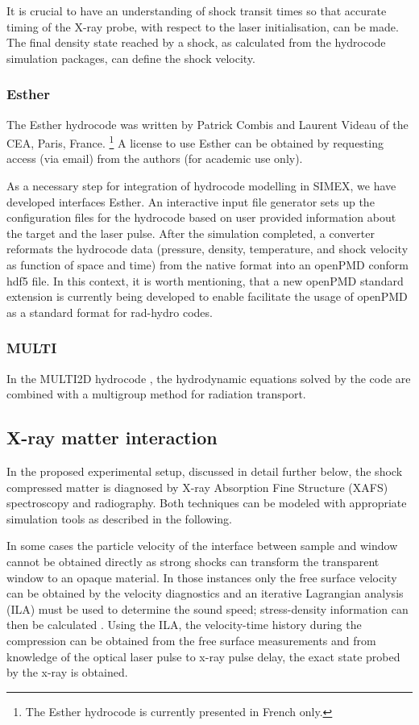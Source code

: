 \documentclass[12pt]{scrartcl}
\begin{document}
It is crucial to have an understanding of shock transit times so that accurate timing of the X-ray probe,
with respect to the laser initialisation, can be made. The final density state reached by a shock, as calculated
from the hydrocode simulation packages, can define the shock velocity.
\subsubsection{Esther}
The Esther hydrocode was written by Patrick Combis and Laurent Videau of the CEA, Paris, France.
\footnote{The Esther hydrocode is currently presented in French only.}
A license to use Esther can be obtained by requesting access (via email) from the authors (for academic use only).

As a necessary step for integration of hydrocode modelling in SIMEX, we have
developed interfaces Esther. An interactive input file generator sets up
the configuration files for the hydrocode based on user provided information
about the target and the laser pulse. After the simulation completed, a
converter reformats the hydrocode data (pressure, density, temperature, and
shock velocity as function of space and time) from the native format into an
openPMD conform hdf5 file. In this context, it is worth mentioning, that a new
openPMD standard extension is currently being developed to enable facilitate the
usage of openPMD as a standard format for rad-hydro codes.

\subsubsection{MULTI}
In the MULTI2D hydrocode \cite{Ramis2009},
the hydrodynamic equations solved by the code are combined with a multigroup method for radiation transport.

\subsection{X-ray matter interaction}
In the proposed experimental setup, discussed in detail further below, the shock compressed matter is diagnosed by
X-ray Absorption Fine Structure (XAFS) spectroscopy and radiography. Both techniques can be modeled with appropriate simulation tools as
described in the following.

In some cases the particle velocity of the interface between sample and window cannot be obtained directly as strong shocks can transform the transparent window to an opaque
material. In those instances only the free surface velocity can be obtained by the velocity diagnostics and an iterative Lagrangian analysis (ILA) must be used to determine the sound
speed; stress-density information can then be calculated \cite{Rothman2006}.  Using the ILA, the velocity-time history during the compression can be obtained from the free surface measurements and from knowledge of the optical laser pulse to x-ray pulse delay, the exact state probed by the x-ray is obtained.
\end{document}
